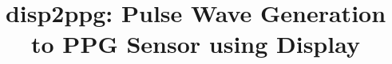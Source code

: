 \documentclass[sigchi,authordraft]{acmart}
\begin{document}
\title{disp2ppg: Pulse Wave Generation to PPG Sensor using Display}




\end{document}
